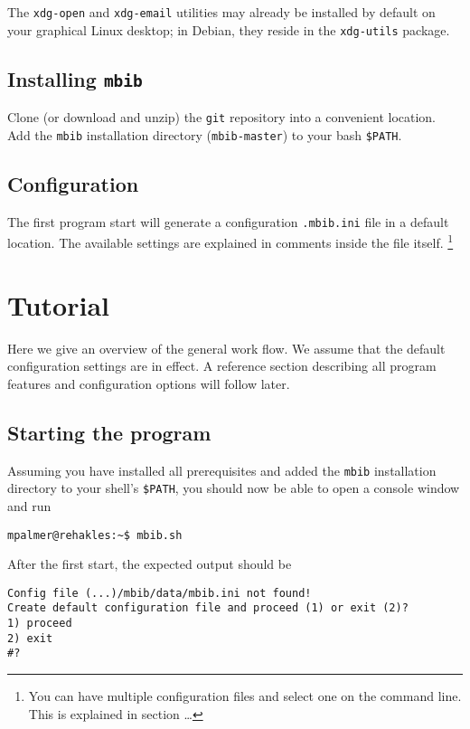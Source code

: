 \documentclass[10pt]{article}
\newcommand*{\mbib}{\texttt{mbib}\xspace}
\newcommand*{\ini}{\texttt{.mbib.ini}\xspace}
\begin{document}
The \texttt{xdg-open} and \texttt{xdg-email} utilities may already be installed by default on your graphical Linux desktop; in Debian, they reside in the \texttt{xdg-utils} package.

\subsection{Installing \mbib}

Clone (or download and unzip) the \texttt{git} repository into a convenient location. Add the \mbib installation directory (\texttt{mbib-master}) to your bash \texttt{\$PATH}.

\subsection{Configuration}

The first program start will generate a configuration \ini file in a default location. The available settings are explained in comments inside the file itself.%
%
\footnote{You can have multiple configuration files and select one on the command line. This is explained in section \dots}

\section{Tutorial}
\label{sec:tutorial}

Here we give an overview of the general work flow. We assume that the default configuration settings are in effect. A reference section describing all program features and configuration options will follow later. 

\subsection{Starting the program}

Assuming you have installed all prerequisites and added the \mbib installation directory to your shell's \texttt{\$PATH}, you should now be able to open a console window and run 

\begin{verbatim}
mpalmer@rehakles:~$ mbib.sh
\end{verbatim}

\noindent After the first start, the expected output should be 

\begin{verbatim}
Config file (...)/mbib/data/mbib.ini not found!
Create default configuration file and proceed (1) or exit (2)?
1) proceed
2) exit
#? 
\end{verbatim}
\end{document}

